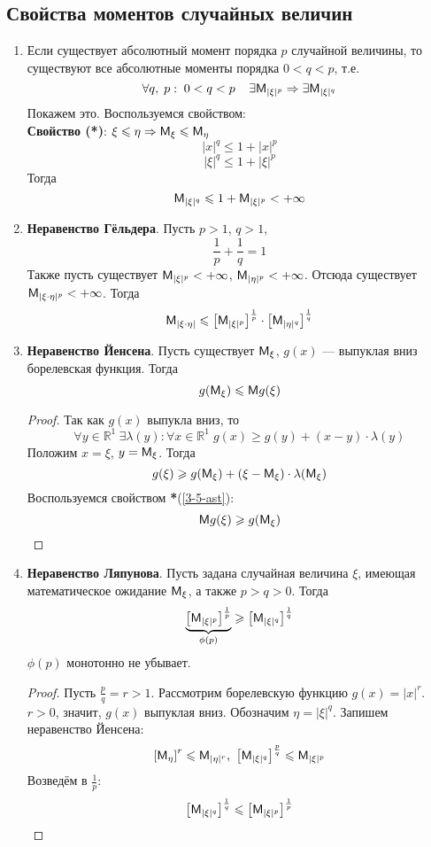 \subsection{Свойства моментов случайных величин}
\begin{enumerate}
  \item Если существует абсолютный момент порядка $p$ случайной величины, то существуют все абсолютные моменты порядка $0 < q < p$, т.е.
  \[
    \forall q,\;p: \; 0 < q < p \;\;\;\; \exists \mathsf{M}_{|\xi|^p} \Rightarrow \exists \mathsf{M}_{|\xi|^q}
  \]
  Покажем это. Воспользуемся свойством: \\
  \textbf{Свойство (*)}: $\xi \leqslant \eta \Rightarrow \mathsf{M}_{\xi} \leqslant \mathsf{M}_{\eta}$ \label{3-5-ast}
  \[
    |x|^q \leqslant 1 + |x|^p
  \]
  \[
    |\xi|^q \leqslant 1 + |\xi|^p
  \]
  Тогда
  \[
    \mathsf{M}_{|\xi|^q} \leqslant 1 + \mathsf{M}_{|\xi|^p} < +\infty
  \]

  \item \textbf{Неравенство Гёльдера}. Пусть $p > 1$, $q > 1$,
  \[
    \frac{1}{p} + \frac{1}{q} = 1
  \]
  Также пусть существует $\mathsf{M}_{|\xi|^p} < +\infty$, $\mathsf{M}_{|\eta|^p} < +\infty$. Отсюда существует $\mathsf{M}_{|\xi \cdot \eta|^p} < +\infty$. Тогда
  \[
    \mathsf{M}_{|\xi \cdot \eta|} \leqslant \left[ \mathsf{M}_{|\xi|^p} \right]^{\frac{1}{p}} \cdot \left[ \mathsf{M}_{|\eta|^q} \right]^{\frac{1}{q}}
  \]
  \item \textbf{Неравенство Йенсена}. Пусть существует $\mathsf{M}_{\xi}$, $g(x)$ --- выпуклая вниз борелевская функция. Тогда
  \[
    g(\mathsf{M}_{\xi}) \leqslant \mathsf{M} g(\xi)
  \]
  \begin{proof}
    Так как $g(x)$ выпукла вниз, то
    \[
      \forall y \in \mathbb{R}^1 \ \exists \lambda(y) : \forall x \in \mathbb{R}^1 \; g(x) \geqslant g(y) + (x-y) \cdot \lambda(y)
    \]
    Положим $x = \xi$, $y = \mathsf{M}_{\xi}$. Тогда
    \[
      g(\xi) \geqslant g(\mathsf{M}_{\xi}) + (\xi - \mathsf{M}_{\xi}) \cdot \lambda (\mathsf{M}_{\xi})
    \]
    Воспользуемся свойством \textbf{*}(\ref{3-5-ast}):
    \[
      \mathsf{M} g(\xi) \geqslant g(\mathsf{M}_{\xi})
    \]
  \end{proof}
  \item \textbf{Неравенство Ляпунова}. Пусть задана случайная величина $\xi$, имеющая математическое ожидание $\mathsf{M}_{\xi}$, а также $p > q > 0$. Тогда
  \[
    \underbrace{\left[{\mathsf{M}_{|\xi|^p}} \right]^{\frac{1}{p}}}_{\phi(p)}  \geqslant \left[ \mathsf{M}_{|\xi|^q} \right]^{\frac{1}{q}}
  \]
  $\phi(p)$ монотонно не убывает.
  \begin{proof}
    Пусть $\frac{p}{q} = r > 1$. Рассмотрим борелевскую функцию $g(x) = |x|^r$. $r > 0$, значит, $g(x)$ выпуклая вниз. Обозначим $\eta = |\xi|^q$. Запишем неравенство Йенсена:
    \[
      \left[ \mathsf{M}_{\eta} \right]^r \leqslant \mathsf{M}_{|\eta|^r}, \
      \left[ \mathsf{M}_{|\xi|^q} \right]^{\frac{p}{q}} \leqslant \mathsf{M}_{|\xi|^p}
    \]
    Возведём в $\frac{1}{p}$:
    \[
      \left[ \mathsf{M}_{|\xi|^q} \right]^{\frac{1}{q}} \leqslant \left[ \mathsf{M}_{|\xi|^p} \right]^{\frac{1}{p}}
    \]
  \end{proof}
\end{enumerate}
